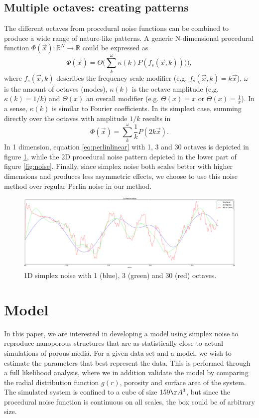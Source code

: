 \documentclass[aps,pre,twocolumn,letterpaper,floatfix,showpacs]{revtex4}
\begin{document}
\subsection{Multiple octaves: creating patterns}
\label{sec:octaves}
The different octaves from procedural noise functions can be combined
to produce a wide range of nature-like patterns. A generic
N-dimensional procedural function $\Phi(\vec x): \mathbb R^N \to
\mathbb R$ could be expressed as
\begin{equation}
\label{eq:procedural}
 \Phi(\vec x) = \Theta \Big(\sum_k^\omega \kappa (k) P(  f_s (\vec x,k) )) \Big),
 \end{equation}
where $f_s(\vec x,k)$ describes the frequency scale modifier (e.g. $f_s(\vec x,k) =
k\vec x$), $\omega$ is the amount of octaves (modes), $\kappa(k)$ is the octave amplitude (e.g. $\kappa(k) = 1/k$)
and $\Theta(x)$ an overall modifier (e.g. $\Theta(x) = x$ or
$\Theta(x) = \frac{1}{x}$). In a sense, $\kappa(k)$ is similar to Fourier coefficients. 
In its simplest case, summing directly over the octaves with amplitude $1/k$ results in 
\begin{equation}
\label{eq:perlinlinear}
 \Phi(\vec x) = \sum_k^\omega \frac{1}{k} P( 2k\vec x).
\end{equation}
In 1 dimension, equation \ref{eq:perlinlinear} with 1, 3 and 30 octaves is depicted in figure \ref{fig:1dperlin}, while the 2D procedural noise pattern depicted in the lower
part of figure \ref{fig:noise}. Finally, since simplex noise both scales better with higher dimensions and produces less asymmetric effects, we choose to use this noise method over regular Perlin noise in our method.  

\begin{figure}
\includegraphics[width=.5\textwidth]{1d_perlin.png}
\caption{1D simplex noise with 1 (blue), 3 (green) and 30 (red) octaves. }
\label{fig:1dperlin}
\end{figure}


\section{Model}
In this paper, we are interested in developing a model using simplex noise to reproduce nanoporous structures that are as statistically close to actual simulations of porous media. For a given data set and a model, we wish to estimate the parameters that best represent the data. This is performed through a full likelihood analysis, where we in addition validate the model by comparing the radial distribution function $g(r)$, porosity and surface area of the system. The simulated system is confined to a cube of size $159 \AA^3$, but since the procedural noise function is continuous on all scales, the box could be of arbitrary size. 
\end{document}
